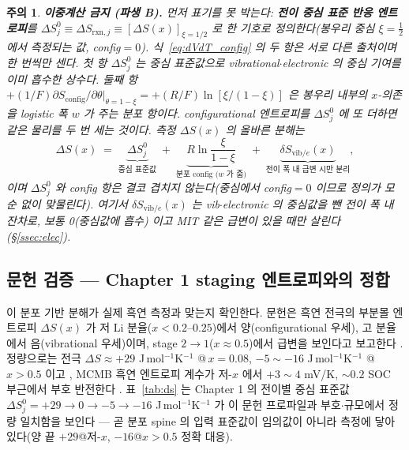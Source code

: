 \documentclass[11pt,a4paper]{article}
\newtheorem*{warnbox}{주의}
\newcommand{\rxn}{\mathrm{rxn}}
\newcommand{\config}{\mathrm{config}}
\newcommand{\vib}{\mathrm{vib}}
\begin{document}
\begin{warnbox}
\textbf{이중계산 금지 (파생 B).} 먼저 표기를 못 박는다: \textbf{전이 중심 표준 반응 엔트로피}를
$\Delta S^0_j\equiv\Delta S_{\rxn,j}\equiv[\Delta S(x)]_{\xi=1/2}$ 로 한 기호로 정의한다(봉우리 중심 $\xi=\tfrac12$
에서 측정되는 값, config$=0$). 식~\eqref{eq:dVdT_config} 의 두 항은 \emph{서로 다른 출처}이며 한 번씩만 센다.
첫 항 $\Delta S^0_j$ 는 중심 표준값으로 vibrational$\cdot$electronic 의 중심 기여를 이미 흡수한 상수다. 둘째 항
$+(1/F)\partial S_\config/\partial\theta|_{\theta=1-\xi}=+(R/F)\ln[\xi/(1-\xi)]$ 은 봉우리 \emph{내부}의 $x$-의존을
logistic 폭 $w$ 가 주는 \emph{분포 항}이다. configurational 엔트로피를 $\Delta S^0_j$ 에 \emph{또} 더하면 같은
물리를 두 번 세는 것이다. 측정 $\Delta S(x)$ 의 올바른 분해는
\[
\Delta S(x) \;=\; \underbrace{\Delta S^0_j}_{\text{중심 표준값}}
\;+\;\underbrace{R\ln\frac{\xi}{1-\xi}}_{\text{분포 config (}w\text{ 가 줌)}}
\;+\;\underbrace{\delta S_{\vib/e}(x)}_{\text{전이 폭 내 급변 시만 분리}},
\]
이며 $\Delta S^0_j$ 와 config 항은 결코 겹치지 않는다(중심에서 config$=0$ 이므로 정의가 모순 없이 맞물린다).
여기서 $\delta S_{\vib/e}(x)$ 는 vib$\cdot$electronic 의 \emph{중심값을 뺀} 전이 폭 내 잔차로, 보통 0(중심값에 흡수)
이고 MIT 같은 급변이 있을 때만 살린다(\S\ref{ssec:elec}).
\end{warnbox}

\subsection{문헌 검증 — Chapter 1 staging 엔트로피와의 정합}
이 분포 기반 분해가 실제 흑연 측정과 맞는지 확인한다. 문헌은 흑연 전극의 부분몰 엔트로피 $\Delta S(x)$ 가
저 Li 분율($x<0.2$--$0.25$)에서 양(configurational 우세), 고 분율에서 음(vibrational 우세)이며, stage
$2\to1$($x\approx0.5$)에서 급변을 보인다고 보고한다 \cite{reynier2003,allart2018}. 정량으로는 전극
$\Delta S\approx+29$ J\,mol$^{-1}$K$^{-1}$ @\,$x=0.08$, $-5\sim-16$ J\,mol$^{-1}$K$^{-1}$ @\,$x>0.5$ 이고
\cite{allart2018}, MCMB 흑연 엔트로피 계수가 저-$x$ 에서 $+3\sim4$ mV/K, $\sim0.2$ SOC 부근에서 부호 반전한다
\cite{msmr_partII}. 표~\ref{tab:ds} 는 Chapter 1 의 전이별 중심 표준값 $\Delta S^0_j=+29\to0\to-5\to-16$
J\,mol$^{-1}$K$^{-1}$ 가 이 문헌 프로파일과 부호$\cdot$규모에서 정량 일치함을 보인다 — 곧 분포 spine 의 입력
표준값이 임의값이 아니라 측정에 닿아 있다(양 끝 $+29$@저-$x$, $-16$@$x>0.5$ 정확 대응).
\end{document}
